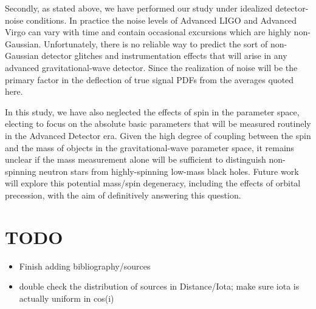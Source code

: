 \documentclass[11pt,a4paper]{emulateapj} 
\newcommand{\carl}[1]{{\color{red} #1}}
\begin{document}
Secondly, as stated above, we have performed our study under idealized
detector-noise conditions.  In practice the noise levels of Advanced
LIGO and Advanced Virgo can vary with time and contain occasional
excursions which are highly non-Gaussian.  Unfortunately, there is no
reliable way to predict the sort of non-Gaussian detector glitches and
instrumentation effects that will arise in any advanced
gravitational-wave detector.  Since the realization of noise will be
the primary factor in the deflection of true signal PDFs from the
averages quoted here.

In this study, we have also neglected the effects of spin in the
parameter space, electing to focus on the absolute basic parameters
that will be measured routinely in the Advanced Detector era.  Given
the high degree of coupling between the spin and the mass of objects
in the gravitational-wave parameter space, it remains unclear if the
mass measurement alone will be sufficient to distinguish non-spinning
neutron stars from highly-spinning low-mass black holes.  Future work
will explore this potential mass/spin degeneracy, including the
effects of orbital precession, with the aim of definitively answering
this question.

\carl{
\section{TODO}
 \begin{itemize}
 \item Finish adding bibliography/sources
 \item double check the distribution of sources in Distance/Iota; make
   sure iota is actually uniform in cos(i)
 \end{itemize}
 }

 {}
\end{document}
